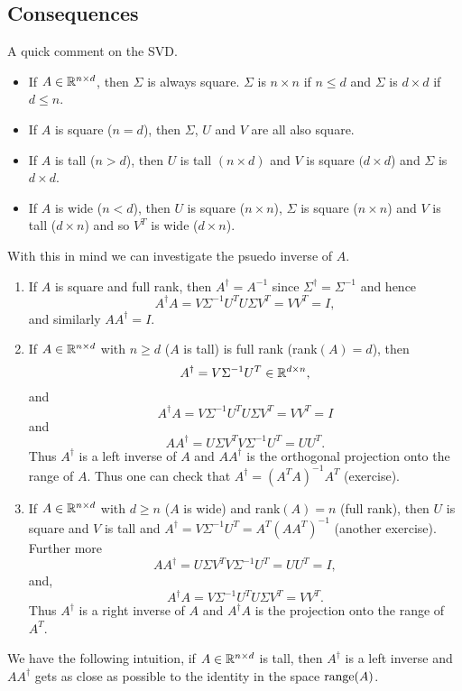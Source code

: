 \subsection{Consequences}
\begin{remark}
    A quick comment on the SVD. 
    \begin{itemize}
    
        \item If $A \in {\mathbb R}^{n \times d}$, then $\Sigma$ is always square. $\Sigma$ is $n \times n$ if $n \le d$ and $\Sigma$ is $d \times d$ if $d \le n$.
        \item If $A$ is square ($n=d$), then $\Sigma$, $U$ and $V$ are all also square.
    
        \item If $A$ is tall ($n > d$), then $U$ is tall $(n \times d)$ and $V$ is square $(d \times d$) and $\Sigma$ is $d \times d$.
    
        \item If $A$ is wide ($n < d$), then $U$ is square ($n \times n$), $\Sigma$ is square ($n \times n$) and $V$ is tall ($d \times n$) and so $V^T$ is wide ($d \times n$). 
    
    \end{itemize}
    With this in mind we can investigate the psuedo inverse of $A$.

\end{remark}
\begin{enumerate}
    \item If $A$ is square and full rank, then $A^\dagger = A^{-1}$ since $\Sigma^\dagger = \Sigma^{-1}$ and hence 
    \[A^\dagger A = V\Sigma^{-1}U^TU\Sigma V^T = VV^T = I, \]
    and similarly $AA^\dagger = I$.
    
    \item If $A \in {\mathbb R}^{n \times d}$ with $n \ge d$ ($A$ is tall) is full rank (rank$(A)=d$), then 
    \[ A^\dagger = V\Sigma^{-1}U^T \in {\mathbb R}^{d\times n},\]
    and \[A^\dagger A = V\Sigma^{-1}U^TU\Sigma V^T = VV^T = I \]
    and 
    \[AA^\dagger = U \Sigma V^T V \Sigma^{-1} U^T = UU^T. \]
    Thus $A^\dagger$ is a left inverse of $A$ and $AA^\dagger$ is the orthogonal projection onto the range of $A$. Thus one can check that $A^\dagger = (A^TA)^{-1}A^T$ (exercise).
    
    \item If $A \in {\mathbb R}^{n \times d}$ with $d \ge n$ ($A$ is wide) and rank$(A)=n$ (full rank), then $U$ is square and $V$ is tall and $A^\dagger = V\Sigma^{-1}U^T = A^T(AA^T)^{-1}$ (another exercise). Further more
    \[AA^\dagger = U\Sigma V^TV\Sigma^{-1}U^T = UU^T = I, \]
    and,
    \[A^\dagger A = V\Sigma^{-1}U^TU\Sigma V^T = VV^T. \]
    Thus $A^\dagger$ is a right inverse of $A$ and $A^\dagger A$ is the projection onto the range of $A^T$.
\end{enumerate}
We have the following intuition, if $A \in {\mathbb R}^{n \times d}$ is tall, then $A^\dagger$ is a left inverse and $AA^\dagger$ gets as close as possible to the identity in the space $\operatorname{range}(A)$. 
